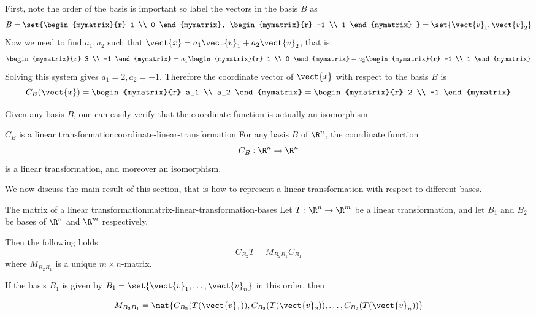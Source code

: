 \begin{solution}
First, note the order of the basis is important so label the vectors in the basis $B$ as
\[
B = \set{\begin{mymatrix}{r}
1 \\
0
\end{mymatrix}, \begin{mymatrix}{r}
-1 \\
1
\end{mymatrix} } = \set{\vect{v}_1, \vect{v}_2 } \]
Now we need to find $a_1, a_2$ such that $\vect{x} = a_1 \vect{v}_1 + a_2 \vect{v}_2$, that is:
\[
\begin{mymatrix}{r}
3 \\
-1
\end{mymatrix}
=
a_1
\begin{mymatrix}{r}
1 \\
0
\end{mymatrix}
+ a_2
\begin{mymatrix}{r}
-1 \\
1
\end{mymatrix}\]
Solving this system gives $a_1 = 2, a_2 = -1$. Therefore the coordinate vector of $\vect{x}$ with respect to the basis $B$ is
\[
C_B(\vect{x})
=
\begin{mymatrix}{r}
a_1 \\
a_2
\end{mymatrix}
= \begin{mymatrix}{r}
2 \\
-1
\end{mymatrix}
\]
\end{solution}

Given any basis $B$, one can easily verify that the coordinate function is actually an isomorphism.

\begin{theorem}{$C_B$ is a linear transformation}{coordinate-linear-transformation}
For any basis $B$ of $\R^n$, the coordinate function
\[ C_B: \R^n  \rightarrow \R^n  \]
is a linear transformation, and moreover an isomorphism.
\end{theorem}

We now discuss the main  result  of this section, that is how
to represent a linear transformation with respect to different
bases.

\begin{theorem}{The matrix of a linear transformation}{matrix-linear-transformation-bases}
Let $T: \R^n \to \R^m$ be a linear transformation,
and let $B_1$ and $B_2$ be bases of $\R^{n}$ and
$\R^{m}$ respectively.

Then the following holds
\begin{equation}
C_{B_2} T = M_{B_{2} B_{1}} C_{B_1}   \label{matrix-equation}
\end{equation}
where $M_{B_{2} B_{1}}$  is a unique $m \times n$-matrix.

If the basis $B_1$ is given by $B_1=\set{\vect{v}_1,\ldots, \vect{v}_n}$ in this order, then

\[  M_{B_{2} B_{1}} = \mat{C_{B_2}(T(\vect{v}_1)), C_{B_2}(T(\vect{v}_2)), \ldots, C_{B_2}(T(\vect{v}_n)) } \]
\end{theorem}

